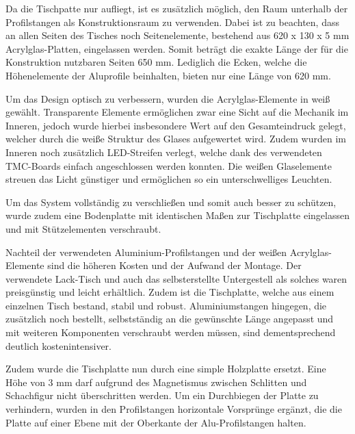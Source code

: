 Da die Tischpatte nur aufliegt, ist es zusätzlich möglich, den Raum
unterhalb der Profilstangen als Konstruktionsraum zu verwenden. Dabei
ist zu beachten, dass an allen Seiten des Tisches noch Seitenelemente,
bestehend aus 620 x 130 x 5 mm Acrylglas-Platten, eingelassen werden.
Somit beträgt die exakte Länge der für die Konstruktion nutzbaren Seiten
650 mm. Lediglich die Ecken, welche die Höhenelemente der Aluprofile
beinhalten, bieten nur eine Länge von 620 mm.

Um das Design optisch zu verbessern, wurden die Acrylglas-Elemente in
weiß gewählt. Transparente Elemente ermöglichen zwar eine Sicht auf die
Mechanik im Inneren, jedoch wurde hierbei insbesondere Wert auf den
Gesamteindruck gelegt, welcher durch die weiße Struktur des Glases
aufgewertet wird. Zudem wurden im Inneren noch zusätzlich LED-Streifen
verlegt, welche dank des verwendeten TMC-Boards einfach angeschlossen
werden konnten. Die weißen Glaselemente streuen das Licht günstiger und
ermöglichen so ein unterschwelliges Leuchten.

Um das System vollständig zu verschließen und somit auch besser zu
schützen, wurde zudem eine Bodenplatte mit identischen Maßen zur
Tischplatte eingelassen und mit Stützelementen verschraubt.

Nachteil der verwendeten Aluminium-Profilstangen und der weißen
Acrylglas-Elemente sind die höheren Kosten und der Aufwand der Montage.
Der verwendete Lack-Tisch und auch das selbsterstellte Untergestell als
solches waren preisgünstig und leicht erhältlich. Zudem ist die
Tischplatte, welche aus einem einzelnen Tisch bestand, stabil und
robust. Aluminiumstangen hingegen, die zusätzlich noch bestellt,
selbstständig an die gewünschte Länge angepasst und mit weiteren
Komponenten verschraubt werden müssen, sind dementsprechend deutlich
kostenintensiver.

Zudem wurde die Tischplatte nun durch eine simple Holzplatte ersetzt.
Eine Höhe von 3 mm darf aufgrund des Magnetismus zwischen Schlitten und
Schachfigur nicht überschritten werden. Um ein Durchbiegen der Platte zu
verhindern, wurden in den Profilstangen horizontale Vorsprünge ergänzt,
die die Platte auf einer Ebene mit der Oberkante der Alu-Profilstangen
halten.

